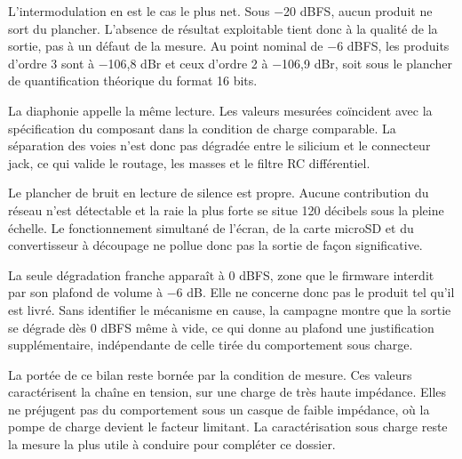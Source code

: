 L'intermodulation en est le cas le plus net. Sous $-$20 dBFS, aucun produit ne sort du plancher. L'absence de résultat exploitable tient donc à la qualité de la sortie, pas à un défaut de la mesure. Au point nominal de $-$6 dBFS, les produits d'ordre 3 sont à $-$106,8 dBr et ceux d'ordre 2 à $-$106,9 dBr, soit sous le plancher de quantification théorique du format 16 bits.

La \gls{diaphonie} appelle la même lecture. Les valeurs mesurées coïncident avec la spécification du composant dans la condition de charge comparable. La séparation des voies n'est donc pas dégradée entre le silicium et le connecteur jack, ce qui valide le routage, les masses et le filtre RC différentiel.

Le plancher de bruit en lecture de silence est propre. Aucune contribution du réseau n'est détectable et la raie la plus forte se situe 120 décibels sous la pleine échelle. Le fonctionnement simultané de l'écran, de la carte microSD et du convertisseur à découpage ne pollue donc pas la sortie de façon significative.

La seule dégradation franche apparaît à 0 dBFS, zone que le firmware interdit par son plafond de volume à $-$6 dB. Elle ne concerne donc pas le produit tel qu'il est livré. Sans identifier le mécanisme en cause, la campagne montre que la sortie se dégrade dès 0 dBFS même à vide, ce qui donne au plafond une justification supplémentaire, indépendante de celle tirée du comportement sous charge.

La portée de ce bilan reste bornée par la condition de mesure. Ces valeurs caractérisent la chaîne en tension, sur une charge de très haute impédance. Elles ne préjugent pas du comportement sous un casque de faible impédance, où la pompe de charge devient le facteur limitant. La caractérisation sous charge reste la mesure la plus utile à conduire pour compléter ce dossier.